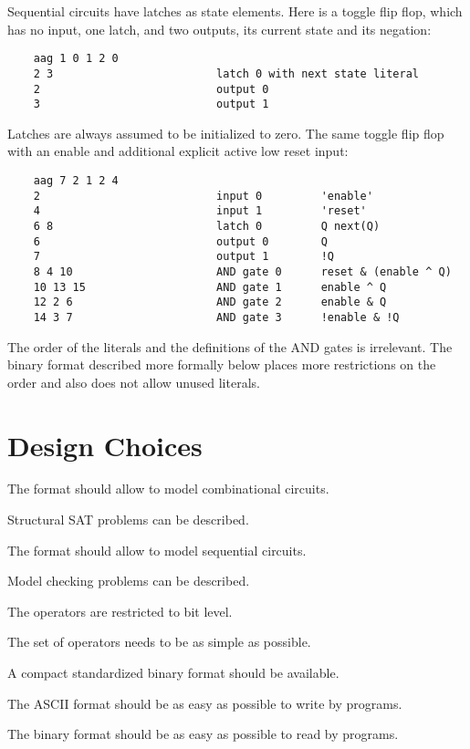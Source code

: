 \documentclass[10pt]{llncs}
\begin{document}
  Sequential circuits have latches as state elements. Here is a toggle flip
  flop, which has no input, one latch, and two outputs, its current state and
  its negation:
\begin{verbatim}
    aag 1 0 1 2 0
    2 3                         latch 0 with next state literal
    2                           output 0
    3                           output 1
\end{verbatim}
  Latches are always assumed to be initialized to zero.  The same toggle
  flip flop with an enable and additional explicit active low reset input:
\begin{verbatim}
    aag 7 2 1 2 4
    2                           input 0         'enable'
    4                           input 1         'reset'
    6 8                         latch 0         Q next(Q)
    6                           output 0        Q
    7                           output 1        !Q
    8 4 10                      AND gate 0      reset & (enable ^ Q)
    10 13 15                    AND gate 1      enable ^ Q
    12 2 6                      AND gate 2      enable & Q
    14 3 7                      AND gate 3      !enable & !Q
\end{verbatim}
  The order of the literals and the definitions of the AND gates
  is irrelevant.  The binary format described more formally below places
  more restrictions on the order and also does not allow unused literals.

\section{Design Choices}
  
  The format should allow to model combinational circuits.

  Structural SAT problems can be described.
  
  The format should allow to model sequential circuits.

  Model checking problems can be described.

  The operators are restricted to bit level.

  The set of operators needs to be as simple as possible.

  A compact standardized binary format should be available.

  The ASCII format should be as easy as possible to write by programs.

  The binary format should be as easy as possible to read by programs.
\end{document}
